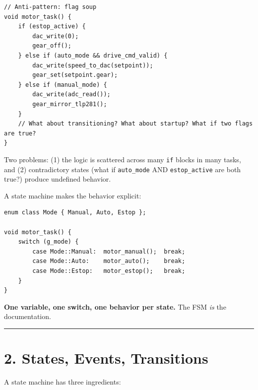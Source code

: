 \documentclass[12pt,a4paper,oneside]{report}
\begin{document}
\begin{verbatim}
// Anti-pattern: flag soup
void motor_task() {
    if (estop_active) {
        dac_write(0);
        gear_off();
    } else if (auto_mode && drive_cmd_valid) {
        dac_write(speed_to_dac(setpoint));
        gear_set(setpoint.gear);
    } else if (manual_mode) {
        dac_write(adc_read());
        gear_mirror_tlp281();
    }
    // What about transitioning? What about startup? What if two flags are true?
}
\end{verbatim}

Two problems: (1) the logic is scattered across many \texttt{if} blocks in many
tasks, and (2) contradictory states (what if \texttt{auto\_mode} AND
\texttt{estop\_active} are both true?) produce undefined behavior.

A state machine makes the behavior explicit:

\begin{verbatim}
enum class Mode { Manual, Auto, Estop };

void motor_task() {
    switch (g_mode) {
        case Mode::Manual:  motor_manual();  break;
        case Mode::Auto:    motor_auto();    break;
        case Mode::Estop:   motor_estop();   break;
    }
}
\end{verbatim}

\textbf{One variable, one switch, one behavior per state.} The FSM \emph{is} the
documentation.

\begin{center}\rule{0.5\linewidth}{0.5pt}\end{center}

\section{2. States, Events, Transitions}\label{states-events-transitions}

A state machine has three ingredients:
\end{document}
